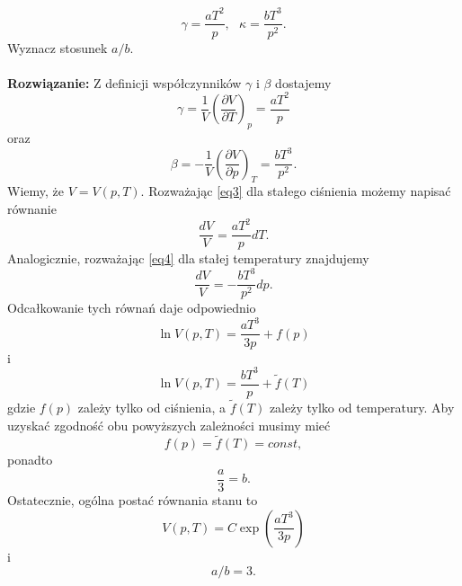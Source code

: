 \documentclass[11pt,a4paper]{article}
\newcommand{\Partial}[3]{\left( \frac{\partial #1}{\partial #2} \right)_{#3}}
\begin{document}
\[ \gamma=\frac{a T^2}{p}, ~~~\kappa=\frac{b T^3}{p^2}. \]
Wyznacz stosunek $a/b$.\\
\\
\textbf{Rozwiązanie:}
Z definicji współczynników $\gamma$ i $\beta$ dostajemy
\begin{equation}
\label{eq3}
    \gamma=\frac{1}{V}\Partial{V}{T}{p}=\frac{a T^2}{p}
\end{equation}
oraz
\begin{equation}
\label{eq4}
    \beta=-\frac{1}{V}\Partial{V}{p}{T}=\frac{bT^3}{p^2}.
\end{equation}
Wiemy, że $V=V(p,T)$. Rozważając \eqref{eq3} dla stałego ciśnienia możemy napisać równanie
\begin{equation*}
    \frac{dV}{V}=\frac{aT^2}{p}dT.
\end{equation*}
Analogicznie, rozważając \eqref{eq4} dla stałej temperatury znajdujemy
\begin{equation*}
    \frac{dV}{V}=-\frac{bT^3}{p^2}dp.
\end{equation*}
Odcałkowanie tych równań daje odpowiednio
\begin{equation*}
    \ln V(p,T)=\frac{aT^3}{3p}+f(p)
\end{equation*}
i
\begin{equation*}
    \ln V(p,T)=\frac{bT^3}{p}+\tilde{f}(T)
\end{equation*}
gdzie $f(p)$ zależy tylko od ciśnienia, a $\tilde{f}(T)$ zależy tylko od temperatury. Aby uzyskać zgodność obu powyższych zależności musimy mieć
\begin{equation*}
    f(p)=\tilde{f}(T)=const,
\end{equation*}
ponadto
\begin{equation*}
    \frac{a}{3}=b.
\end{equation*}
Ostatecznie, ogólna postać równania stanu to
\begin{equation*}
    V(p,T)=C\exp \left( \frac{a T^3}{3p} \right)
\end{equation*}
i
\begin{equation*}
    a/b=3.
\end{equation*}
\end{document}
